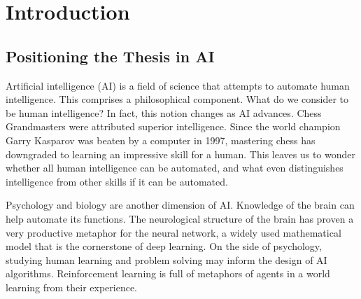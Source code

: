 \newpage
\section{Introduction}






\subsection{Positioning the Thesis in AI}

Artificial intelligence (AI) is a field of science that attempts to automate human intelligence. 
This comprises a philosophical component. What do we consider to be human intelligence? In fact, this notion changes as AI advances. Chess Grandmasters were attributed superior intelligence. Since the world champion Garry Kasparov was beaten by a computer in 1997, mastering chess has downgraded to learning an impressive skill for a human. This leaves us to wonder whether all human intelligence can be automated, and what even distinguishes intelligence from other skills if it can be automated.

Psychology and biology are another dimension of AI. Knowledge of the brain can help automate its functions. The neurological structure of the brain has proven a very productive metaphor for the neural network, a widely used mathematical model that is the cornerstone of deep learning. On the side of psychology, studying human learning and problem solving may inform the design of AI algorithms. Reinforcement learning is full of metaphors of agents in a world learning from their experience.


